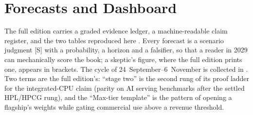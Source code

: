 \chapter{Forecasts and Dashboard}
\label{c:register}

The full edition carries a graded evidence ledger, a machine-readable claim register, and the two tables reproduced here . Every forecast is a scenario judgment [S] with a probability, a horizon and a falsifier, so that a reader in 2029 can mechanically score the book; a skeptic's figure, where the full edition prints one, appears in brackets. The cycle of 24~September--6~November is collected in . Two terms are the full edition's: ``stage two'' is the second rung of its proof ladder for the integrated-CPU claim (parity on AI serving benchmarks after the settled HPL/HPCG rung), and the ``Max-tier template'' is the pattern of opening a flagship's weights while gating commercial use above a revenue threshold.

